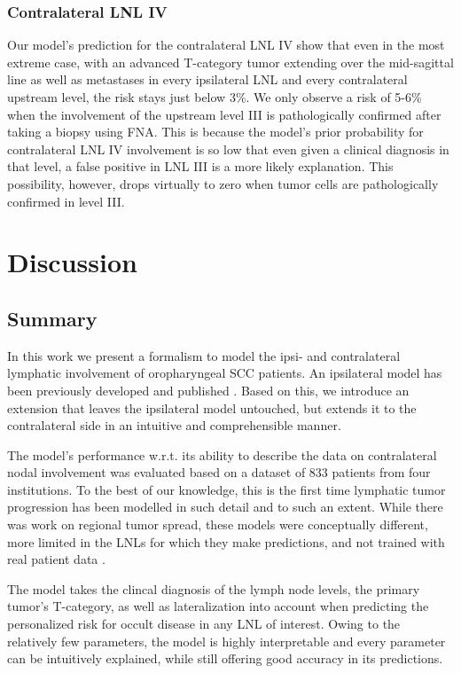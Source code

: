 \documentclass[
  sn-mathphys-num,
]{sn-jnl}
\begin{document}
\subsubsection{Contralateral LNL IV}\label{contralateral-lnl-iv}

Our model's prediction for the contralateral LNL IV show that even in
the most extreme case, with an advanced T-category tumor extending over
the mid-sagittal line as well as metastases in every ipsilateral LNL and
every contralateral upstream level, the risk stays just below 3\%. We
only observe a risk of 5-6\% when the involvement of the upstream level
III is pathologically confirmed after taking a biopsy using FNA. This is
because the model's prior probability for contralateral LNL IV
involvement is so low that even given a clinical diagnosis in that
level, a false positive in LNL III is a more likely explanation. This
possibility, however, drops virtually to zero when tumor cells are
pathologically confirmed in level III.

\section{Discussion}\label{sec-discussion}

\subsection{Summary}\label{summary}

In this work we present a formalism to model the ipsi- and contralateral
lymphatic involvement of oropharyngeal SCC patients. An ipsilateral
model has been previously developed and published
\citep{ludwig_hidden_2021, ludwig_modelling_2023}. Based on this, we
introduce an extension that leaves the ipsilateral model untouched, but
extends it to the contralateral side in an intuitive and comprehensible
manner.

The model's performance w.r.t. its ability to describe the data on
contralateral nodal involvement was evaluated based on a dataset of 833
patients from four institutions. To the best of our knowledge, this is
the first time lymphatic tumor progression has been modelled in such
detail and to such an extent. While there was work on regional tumor
spread, these models were conceptually different, more limited in the
LNLs for which they make predictions, and not trained with real patient
data \citep{benson_markov_2006, jung_development_2017}.

The model takes the clincal diagnosis of the lymph node levels, the
primary tumor's T-category, as well as lateralization into account when
predicting the personalized risk for occult disease in any LNL of
interest. Owing to the relatively few parameters, the model is highly
interpretable and every parameter can be intuitively explained, while
still offering good accuracy in its predictions.
\end{document}
